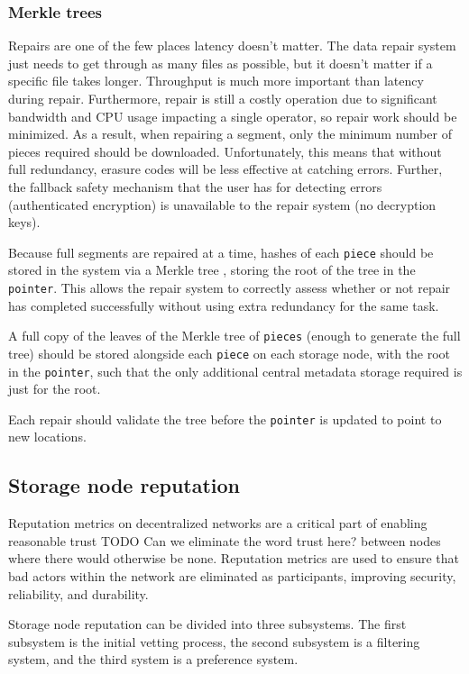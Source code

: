 \documentclass[a4paper,10pt]{article} \usepackage[utf8]{inputenc}
\newcommand{\x}[1]{{\tt #1}} \newcommand{\code}[1]{{\tt #1}}
\newcommand{\todo}[1]{{\color{red} TODO #1 }}
\begin{document}
\subsubsection{Merkle trees}

Repairs are one of the few places latency doesn't matter. The data repair system
just needs to get through as many files as possible, but it doesn't matter if
a specific file takes longer. Throughput is much more important than
latency during repair. Furthermore, repair
is still a costly operation due to significant bandwidth and CPU usage
impacting a single operator, so repair work should be minimized.
As a result, when repairing a segment,
only the minimum number of pieces required should be downloaded.
Unfortunately, this means that
without full redundancy, erasure codes will be less effective at catching
errors. Further, the fallback safety mechanism that the user has for detecting
errors (authenticated encryption) is unavailable to the repair system (no
decryption keys).

Because full segments are repaired at a time, hashes of
each \x{piece} should be stored in the system via a Merkle tree
\cite{merkle-tree}, storing the root of the tree in the \x{pointer}. This allows
the repair system to correctly assess whether or not repair has completed
successfully without using extra redundancy for the same task.

A full copy of the leaves of the Merkle tree of \x{pieces} (enough to generate
the full tree) should be stored alongside each \x{piece} on each storage node,
with the root in the \x{pointer}, such that the only additional central
metadata storage required is just for the root.

Each repair should validate the tree before the \x{pointer} is updated to
point to new locations.

\subsection{Storage node reputation}

Reputation metrics on decentralized networks are a critical part of
enabling reasonable trust \todo{Can we eliminate the word trust here?} between nodes
where there would otherwise be none. Reputation metrics
are used to ensure that bad actors
within the network are eliminated as participants, improving security,
reliability, and durability.

Storage node reputation can be divided into three subsystems. The first
subsystem is the initial vetting process, the second subsystem is a filtering
system, and the third system is a preference system.
\end{document}
